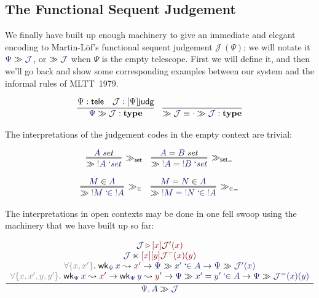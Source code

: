 \documentclass[acmtoplas]{acmtrans2m}
\def\InputModeColorName{MidnightBlue}
\def\OutputModeColorName{Maroon}
\newcommand\InputMode[1]{{\color{\InputModeColorName}{#1}}}
\newcommand\OutputMode[1]{{\color{\OutputModeColorName}{#1}}}
\newcommand\type{\mathbf{type}}
\newcommand\sorttele{\mathsf{tele}}
\newcommand\sortj{\mathsf{judg}}
\newcommand\sortoj[1]{[#1]\sortj}
\newcommand\nobind[1]{{\color{Gray}!}#1}
\newcommand\isset[1]{\InputMode{#1}\;\mathit{set}}
\newcommand\eqset[2]{\InputMode{#1}=\InputMode{#2}\;\mathit{set}}
\newcommand\mem[2]{\InputMode{#1}\in\InputMode{#2}}
\newcommand\eqmem[3]{\InputMode{#1}=\InputMode{#2}\in\InputMode{#3}}
\newcommand\lfpi[2]{{\color{Gray}\forall\{#1\}}.\;#2}
\newcommand\weaken[3]{\mathsf{wk}_{\InputMode{#1}}\,\InputMode{#2}\leadsto\OutputMode{#3}}
\newcommand\qisset[1]{#1\;`\mathit{set}}
\newcommand\qeqset[2]{#1=#2\;`\mathit{set}}
\newcommand\qmem[2]{#1\;`\!\!\in#2}
\newcommand\qeqmem[3]{#1=#2\;`\!\!\in#3}
\newcommand\sploot[2]{\InputMode{#1}\triangleright\OutputMode{#2}}
\newcommand\refract[2]{\InputMode{#1}\ltimes\OutputMode{#2}}
\newcommand\sequent[2]{\InputMode{#1}\gg\InputMode{#2}}
\newcommand\nece[1]{\gg\InputMode{#1}}
\newcommand\sequentruleset{\gg_\mathsf{set}}
\newcommand\sequentruleeqset{\gg_{\mathsf{set}_=}}
\newcommand\sequentrulemem{\gg_\in}
\newcommand\sequentruleeqmem{\gg_{\in_=}}
\newcommand\dname[1]{\mathcal{#1}}
\begin{document}
\subsection{The Functional Sequent Judgement}

We finally have built up enough machinery to give an immediate and elegant
encoding to Martin-L\"of's functional sequent judgement $\dname{J}\ (\Psi)$;
we will notate it $\sequent{\Psi}{\dname{J}}$, or $\nece{\dname{J}}$ when
$\Psi$ is the empty telescope. First we will define it, and then we'll go back
and show some corresponding examples between our system and the informal rules
of MLTT~1979.

\begin{gather*}
  \infer{
    \sequent{\Psi}{\dname{J}}:\type
  }{
    \Psi:\sorttele &
    \dname{J}:\sortoj\Psi
  }
  \quad
  \infer{
    \nece{\dname{J}} \equiv \sequent{\cdot}{\dname{J}} : \type
  }{
  }
\end{gather*}

The interpretations of the judgement codes in the empty context are trivial:

\begin{gather*}
  \infer=[\sequentruleset]{
    \nece{\qisset{\nobind{A}}}
  }{
    \isset{A}
  }
  \quad
  \infer=[\sequentruleeqset]{
    \nece{\qeqset{\nobind{A}}{\nobind{B}}}
  }{
    \eqset{A}{B}
  }\\[6pt]
  \infer=[\sequentrulemem]{
    \nece{\qmem{\nobind{M}}{\nobind{A}}}
  }{
    \mem{M}{A}
  }
  \quad
  \infer=[\sequentruleeqmem]{
    \nece{\qeqmem{\nobind{M}}{\nobind{N}}{\nobind{A}}}
  }{
    \eqmem{M}{N}{A}
  }
\end{gather*}

The interpretations in open contexts may be done in one fell swoop using the
machinery that we have built up so far:

\begin{gather*}
  \infer{
    \sequent{\Psi,A}{\dname{J}}
  }{
    \begin{array}{c}
      \sploot{\dname{J}}{[x]\dname{J}'(x)}\\
      \refract{\dname{J}}{[x][y]\dname{J}^=(x)(y)}\\
      \lfpi{x,x'}{
        \weaken{\Psi}{x}{x'}
        \to\sequent{\Psi}{\qmem{x'}{A}}
        \to\sequent{\Psi}{\dname{J}'(x)}
      }\\
      \lfpi{x,x',y,y'}{
        \weaken{\Psi}{x}{x'}
        \to\weaken{\Psi}{y}{y'}
        \to\sequent{\Psi}{\qeqmem{x'}{y'}{A}}
        \to\sequent{\Psi}{\dname{J}^=(x)(y)}
      }\\
    \end{array}
  }
\end{gather*}
\end{document}
